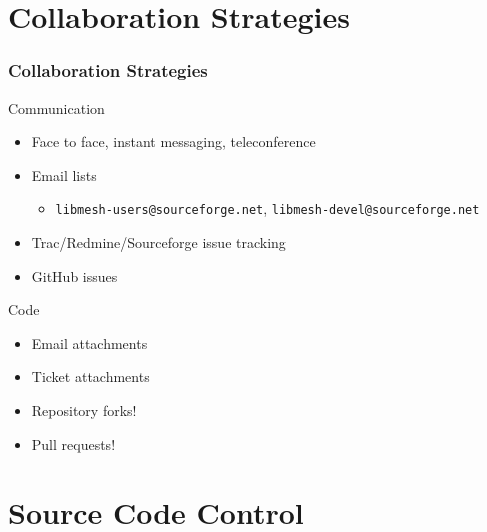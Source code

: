 \documentclass[mathserif]{beamer}
\begin{document}
\section{Collaboration Strategies}


\begin{frame}
\frametitle{Collaboration Strategies}

\begin{block}{Communication}
\begin{itemize}
	\item Face to face, instant messaging, teleconference
	\item Email lists
	\begin{itemize}
		\item \texttt{libmesh-users@sourceforge.net},
			\texttt{libmesh-devel@sourceforge.net}
	\end{itemize}
	\item Trac/Redmine/Sourceforge issue tracking
	\item GitHub issues
\end{itemize}
\end{block}

\begin{block}{Code}
\begin{itemize}
	\item Email attachments
	\item Ticket attachments
		\item Repository forks!
		\item Pull requests!
\end{itemize}
\end{block}

\end{frame}



\section{Source Code Control}
\end{document}
